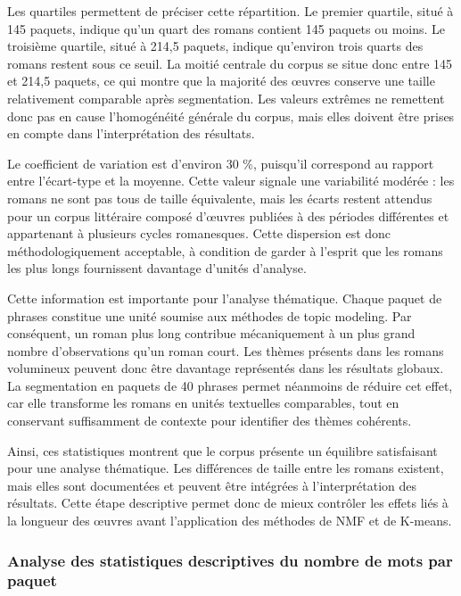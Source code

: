 \documentclass{article}
\begin{document}
Les quartiles permettent de préciser cette répartition. Le premier quartile, situé à 145 paquets, indique qu'un quart des romans contient 145 paquets ou moins. Le troisième quartile, situé à 214,5 paquets, indique qu'environ trois quarts des romans restent sous ce seuil. La moitié centrale du corpus se situe donc entre 145 et 214,5 paquets, ce qui montre que la majorité des œuvres conserve une taille relativement comparable après segmentation. Les valeurs extrêmes ne remettent donc pas en cause l'homogénéité générale du corpus, mais elles doivent être prises en compte dans l'interprétation des résultats.

Le coefficient de variation est d'environ 30 \%, puisqu'il correspond au rapport entre l'écart-type et la moyenne. Cette valeur signale une variabilité modérée : les romans ne sont pas tous de taille équivalente, mais les écarts restent attendus pour un corpus littéraire composé d'œuvres publiées à des périodes différentes et appartenant à plusieurs cycles romanesques. Cette dispersion est donc méthodologiquement acceptable, à condition de garder à l'esprit que les romans les plus longs fournissent davantage d'unités d'analyse.

Cette information est importante pour l'analyse thématique. Chaque paquet de phrases constitue une unité soumise aux méthodes de topic modeling. Par conséquent, un roman plus long contribue mécaniquement à un plus grand nombre d'observations qu'un roman court. Les thèmes présents dans les romans volumineux peuvent donc être davantage représentés dans les résultats globaux. La segmentation en paquets de 40 phrases permet néanmoins de réduire cet effet, car elle transforme les romans en unités textuelles comparables, tout en conservant suffisamment de contexte pour identifier des thèmes cohérents.

Ainsi, ces statistiques montrent que le corpus présente un équilibre satisfaisant pour une analyse thématique. Les différences de taille entre les romans existent, mais elles sont documentées et peuvent être intégrées à l'interprétation des résultats. Cette étape descriptive permet donc de mieux contrôler les effets liés à la longueur des œuvres avant l'application des méthodes de NMF et de K-means.

\subsubsection{Analyse des statistiques descriptives du nombre de mots par paquet}
\end{document}
